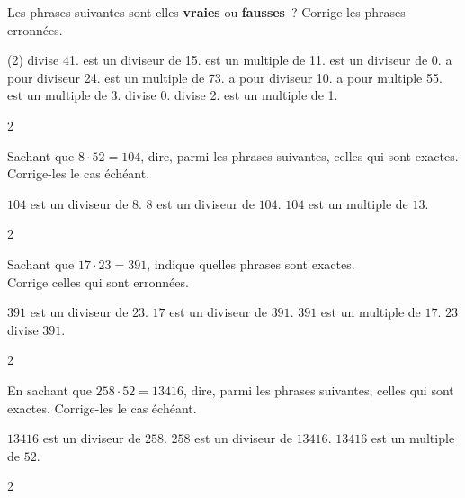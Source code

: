 \documentclass[a4paper,11pt]{report}
\begin{document}
\begin{exo}{
    Les phrases suivantes sont-elles {\color{blue}\textbf{vraies}} ou {\color{blue}\textbf{fausses}}~? Corrige les phrases erronnées.
\begin{tasks}(2)
     divise 41.
     est un diviseur de 15.
     est un multiple de 11.
     est un diviseur de 0. 
     a pour diviseur 24. 
     est un multiple de 73.
     a pour diviseur 10.
     a pour multiple 55. 
     est un multiple de 3.
     divise 0. 
     divise 2.
     est un multiple de 1.
\end{tasks}
\smallskip
}{2}\end{exo}


\begin{exop}{
    Sachant que $8\cdot52=104$, dire, parmi les phrases suivantes, celles qui sont exactes. Corrige-les le cas échéant.
    \begin{tasks}
        \task $104$ est un diviseur de $8$. \hrulefill
        \task $8$ est un diviseur de $104$. \hrulefill
        \task $104$ est un multiple de $13$. \hrulefill
    \end{tasks}
\smallskip
}{2}\end{exop}


\begin{exop}{
   Sachant que $17\cdot23=391$, indique quelles phrases sont exactes. \\ Corrige celles qui sont erronnées.
\begin{tasks}
    \task $391$ est un diviseur de $23$. \hrulefill
    \task $17$ est un diviseur de $391$. \hrulefill
    \task $391$ est un multiple de $17$. \hrulefill
    \task $23$ divise $391$. \hrulefill
\end{tasks}
\smallskip
}{2}\end{exop}




\begin{exop}{
    En sachant que $258\cdot52=13416$, dire, parmi les phrases suivantes, celles qui sont exactes. Corrige-les le cas échéant.
    \begin{tasks}[after-item-skip=0.2em]
        \task $13416$ est un diviseur de $258$. \hrulefill
        \task $258$ est un diviseur de $13416$. \hrulefill
        \task $13416$ est un multiple de $52$. \hrulefill
    \end{tasks}
\smallskip
}{2}\end{exop}
\end{document}
